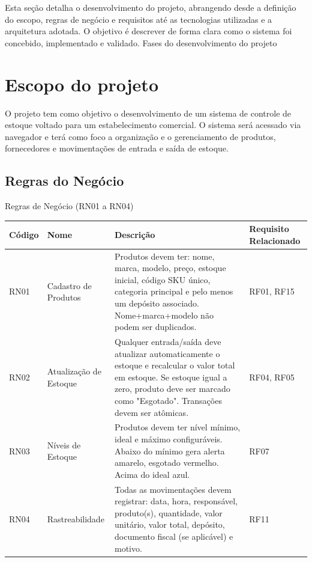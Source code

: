 \documentclass[
	12pt,				%
	openany,			%
	twoside,			%
	a4paper,			%
	english,			%
	brazil				%
	]{abntex2}
\begin{document}
Esta seção detalha o desenvolvimento do projeto, abrangendo desde a definição do escopo, regras de negócio e requisitos até as tecnologias utilizadas e a arquitetura adotada. O objetivo é descrever de forma clara como o sistema foi concebido, implementado e validado.
Fases do desenvolvimento do projeto
\section{Escopo do projeto}

O projeto tem como objetivo o desenvolvimento de um sistema de controle de estoque voltado para um estabelecimento comercial. O sistema será acessado via navegador e terá como foco a organização e o gerenciamento de produtos, fornecedores e movimentações de entrada e saída de estoque.




\subsection{Regras do Negócio}



\begin{quadro}[htb]
\caption{\label{quadro_rn1}Regras de Negócio (RN01 a RN04)}
\centering
\begin{tabular}{|p{1.6cm}|p{4.0cm}|p{7.5cm}|p{2.0cm}|}
    \hline
    \textbf{Código} & \textbf{Nome} & \textbf{Descrição} & \textbf{Requisito Relacionado} \\ \hline

    RN01 & Cadastro de Produtos & Produtos devem ter: nome, marca, modelo, preço, estoque inicial, código SKU único, categoria principal e pelo menos um depósito associado. Nome+marca+modelo não podem ser duplicados. & RF01, RF15 \\ \hline

    RN02 & Atualização de Estoque & Qualquer entrada/saída deve atualizar automaticamente o estoque e recalcular o valor total em estoque. Se estoque igual a zero, produto deve ser marcado como "Esgotado". Transações devem ser atômicas. & RF04, RF05 \\ \hline

    RN03 & Níveis de Estoque & Produtos devem ter nível mínimo, ideal e máximo configuráveis. Abaixo do mínimo gera alerta amarelo, esgotado vermelho. Acima do ideal azul. & RF07 \\ \hline

    RN04 & Rastreabilidade & Todas as movimentações devem registrar: data, hora, responsável, produto(s), quantidade, valor unitário, valor total, depósito, documento fiscal (se aplicável) e motivo. & RF11 \\ \hline

    

\end{tabular}
\end{quadro}
\end{document}
